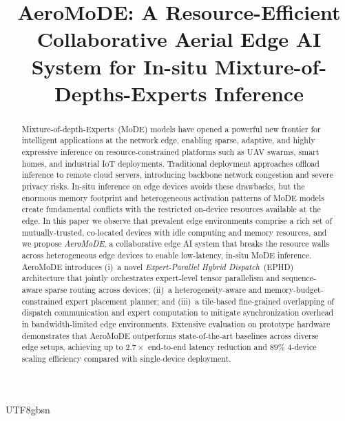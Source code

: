 \documentclass[conference]{IEEEtran}
\begin{document}
\begin{CJK*}{UTF8}{gbsn}

\title{AeroMoDE: A Resource-Efficient Collaborative Aerial Edge AI
       System for In-situ Mixture-of-Depths-Experts Inference}

\author{%
}

\maketitle

\begin{abstract}
Mixture-of-depth-Experts~(MoDE) models have opened a powerful
new frontier for intelligent applications at the network edge,
enabling sparse, adaptive, and highly expressive inference on
resource-constrained platforms such as UAV swarms, smart homes,
and industrial IoT deployments.  Traditional deployment approaches
offload inference to remote cloud servers, introducing backbone
network congestion and severe privacy risks.  In-situ inference on
edge devices avoids these drawbacks, but the enormous memory
footprint and heterogeneous activation patterns of MoDE models
create fundamental conflicts with the restricted on-device
resources available at the edge.  In this paper we observe that
prevalent edge environments comprise a rich set of
mutually-trusted, co-located devices with idle computing and
memory resources, and we propose \textit{AeroMoDE}, a
collaborative edge AI system that breaks the resource walls across
heterogeneous edge devices to enable low-latency, in-situ MoDE
inference.  AeroMoDE introduces (i)~a novel
\emph{Expert-Parallel Hybrid Dispatch}~(EPHD) architecture that
jointly orchestrates expert-level tensor parallelism and
sequence-aware sparse routing across devices; (ii)~a
heterogeneity-aware and memory-budget-constrained expert placement
planner; and (iii)~a tile-based fine-grained overlapping of
dispatch communication and expert computation to mitigate
synchronization overhead in bandwidth-limited edge environments.
Extensive evaluation on prototype hardware demonstrates that
AeroMoDE outperforms state-of-the-art baselines across diverse
edge setups, achieving up to $2.7\times$ end-to-end latency
reduction and $89\%$ 4-device scaling efficiency compared with
single-device deployment.
\end{abstract}


\end{CJK*}
\end{document}
